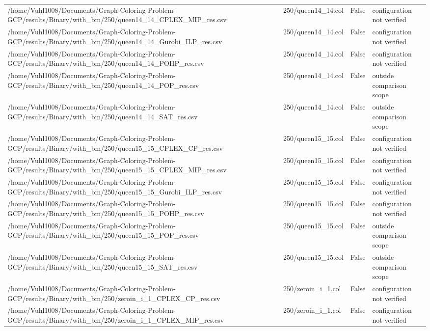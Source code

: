 \begin{table}[htbp]
\begin{tabular}{llll}
/home/Vuhl1008/Documents/Graph-Coloring-Problem-GCP/results/Binary/with\_bm/250/queen14\_14\_CPLEX\_MIP\_res.csv & 250/queen14\_14.col & False & configuration not verified \\
/home/Vuhl1008/Documents/Graph-Coloring-Problem-GCP/results/Binary/with\_bm/250/queen14\_14\_Gurobi\_ILP\_res.csv & 250/queen14\_14.col & False & configuration not verified \\
/home/Vuhl1008/Documents/Graph-Coloring-Problem-GCP/results/Binary/with\_bm/250/queen14\_14\_POHP\_res.csv & 250/queen14\_14.col & False & configuration not verified \\
/home/Vuhl1008/Documents/Graph-Coloring-Problem-GCP/results/Binary/with\_bm/250/queen14\_14\_POP\_res.csv & 250/queen14\_14.col & False & outside comparison scope \\
/home/Vuhl1008/Documents/Graph-Coloring-Problem-GCP/results/Binary/with\_bm/250/queen14\_14\_SAT\_res.csv & 250/queen14\_14.col & False & outside comparison scope \\
/home/Vuhl1008/Documents/Graph-Coloring-Problem-GCP/results/Binary/with\_bm/250/queen15\_15\_CPLEX\_CP\_res.csv & 250/queen15\_15.col & False & configuration not verified \\
/home/Vuhl1008/Documents/Graph-Coloring-Problem-GCP/results/Binary/with\_bm/250/queen15\_15\_CPLEX\_MIP\_res.csv & 250/queen15\_15.col & False & configuration not verified \\
/home/Vuhl1008/Documents/Graph-Coloring-Problem-GCP/results/Binary/with\_bm/250/queen15\_15\_Gurobi\_ILP\_res.csv & 250/queen15\_15.col & False & configuration not verified \\
/home/Vuhl1008/Documents/Graph-Coloring-Problem-GCP/results/Binary/with\_bm/250/queen15\_15\_POHP\_res.csv & 250/queen15\_15.col & False & configuration not verified \\
/home/Vuhl1008/Documents/Graph-Coloring-Problem-GCP/results/Binary/with\_bm/250/queen15\_15\_POP\_res.csv & 250/queen15\_15.col & False & outside comparison scope \\
/home/Vuhl1008/Documents/Graph-Coloring-Problem-GCP/results/Binary/with\_bm/250/queen15\_15\_SAT\_res.csv & 250/queen15\_15.col & False & outside comparison scope \\
/home/Vuhl1008/Documents/Graph-Coloring-Problem-GCP/results/Binary/with\_bm/250/zeroin\_i\_1\_CPLEX\_CP\_res.csv & 250/zeroin\_i\_1.col & False & configuration not verified \\
/home/Vuhl1008/Documents/Graph-Coloring-Problem-GCP/results/Binary/with\_bm/250/zeroin\_i\_1\_CPLEX\_MIP\_res.csv & 250/zeroin\_i\_1.col & False & configuration not verified \\

\end{tabular}
\end{table}

